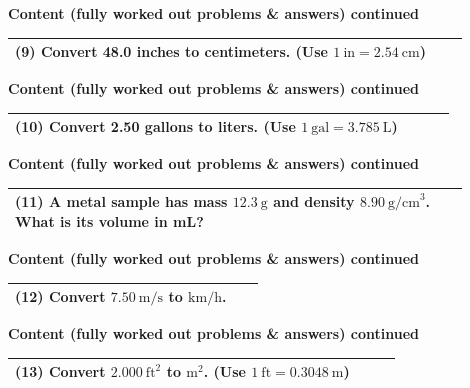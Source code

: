 \documentclass{article}
\begin{document}
\noindent
{\large \textbf{Content (fully worked out problems \& answers) continued}} \\[0.2em]
\begin{tabular}{|p{0.9\linewidth}|}
\hline
\vspace{0.2cm}

\textbf{(9)} Convert 48.0 inches to centimeters. (Use $1~\text{in} = 2.54~\text{cm}$) \\
\hline
\end{tabular}
\newpage

\noindent
{\large \textbf{Content (fully worked out problems \& answers) continued}} \\[0.2em]
\begin{tabular}{|p{0.9\linewidth}|}
\hline
\vspace{0.2cm}

\textbf{(10)} Convert 2.50 gallons to liters. (Use $1~\text{gal} = 3.785~\text{L}$) \\
\hline
\end{tabular}
\newpage

\noindent
{\large \textbf{Content (fully worked out problems \& answers) continued}} \\[0.2em]
\begin{tabular}{|p{0.9\linewidth}|}
\hline
\vspace{0.2cm}

\textbf{(11)} A metal sample has mass $12.3~\text{g}$ and density $8.90~\text{g/cm}^3$. What is its volume in mL? \\
\hline
\end{tabular}
\newpage

\noindent
{\large \textbf{Content (fully worked out problems \& answers) continued}} \\[0.2em]
\begin{tabular}{|p{0.9\linewidth}|}
\hline
\vspace{0.2cm}

\textbf{(12)} Convert $7.50~\text{m/s}$ to $\text{km/h}$. \\
\hline
\end{tabular}
\newpage

\noindent
{\large \textbf{Content (fully worked out problems \& answers) continued}} \\[0.2em]
\begin{tabular}{|p{0.9\linewidth}|}
\hline
\vspace{0.2cm}

\textbf{(13)} Convert $2.000~\text{ft}^2$ to $\text{m}^2$. (Use $1~\text{ft}=0.3048~\text{m}$) \\
\hline
\end{tabular}
\newpage
\end{document}
